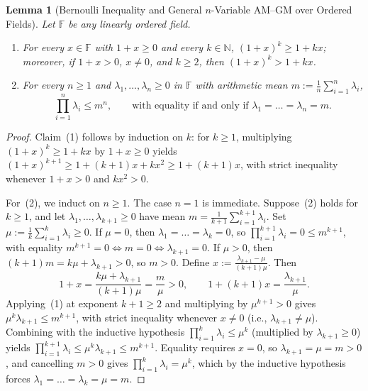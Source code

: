 \documentclass[11pt]{article}
\newtheorem{lemma}[theorem]{Lemma}
\theoremstyle{definition}
\theoremstyle{remark}
\begin{document}
\begin{lemma}[Bernoulli Inequality and General $n$-Variable AM--GM over Ordered Fields]
\label{lem:amgm}
Let $\mathbb{F}$ be any linearly ordered field.
\begin{enumerate}
  \item For every $x \in \mathbb{F}$ with $1 + x \ge 0$ and every $k \in \mathbb{N}$, $(1 + x)^k \ge 1 + k x$; moreover, if $1 + x > 0$, $x \neq 0$, and $k \ge 2$, then $(1 + x)^k > 1 + k x$.
  \item For every $n \ge 1$ and $\lambda_1, \dots, \lambda_n \ge 0$ in $\mathbb{F}$ with arithmetic mean $m := \frac{1}{n}\sum_{i=1}^n \lambda_i$,
  \[
    \prod_{i=1}^n \lambda_i \le m^n, \qquad\text{with equality if and only if }\lambda_1 = \dots = \lambda_n = m.
  \]
\end{enumerate}
\end{lemma}

\begin{proof}
Claim~(1) follows by induction on $k$: for $k \ge 1$, multiplying $(1+x)^k \ge 1 + kx$ by $1 + x \ge 0$ yields $(1+x)^{k+1} \ge 1 + (k+1)x + k x^2 \ge 1 + (k+1)x$, with strict inequality whenever $1 + x > 0$ and $k x^2 > 0$.

For~(2), we induct on $n \ge 1$. The case $n = 1$ is immediate. Suppose~(2) holds for $k \ge 1$, and let $\lambda_1, \dots, \lambda_{k+1} \ge 0$ have mean $m = \frac{1}{k+1}\sum_{i=1}^{k+1} \lambda_i$. Set $\mu := \frac{1}{k}\sum_{i=1}^k \lambda_i \ge 0$. If $\mu = 0$, then $\lambda_1 = \dots = \lambda_k = 0$, so $\prod_{i=1}^{k+1} \lambda_i = 0 \le m^{k+1}$, with equality $m^{k+1} = 0 \iff m = 0 \iff \lambda_{k+1} = 0$. If $\mu > 0$, then $(k+1)m = k\mu + \lambda_{k+1} > 0$, so $m > 0$. Define $x := \frac{\lambda_{k+1} - \mu}{(k+1)\mu}$. Then
\[
  1 + x = \frac{k\mu + \lambda_{k+1}}{(k+1)\mu} = \frac{m}{\mu} > 0, \qquad
  1 + (k + 1)x = \frac{\lambda_{k+1}}{\mu}.
\]
Applying~(1) at exponent $k + 1 \ge 2$ and multiplying by $\mu^{k+1} > 0$ gives $\mu^k \lambda_{k+1} \le m^{k+1}$, with strict inequality whenever $x \neq 0$ (i.e., $\lambda_{k+1} \neq \mu$). Combining with the inductive hypothesis $\prod_{i=1}^k \lambda_i \le \mu^k$ (multiplied by $\lambda_{k+1} \ge 0$) yields $\prod_{i=1}^{k+1} \lambda_i \le \mu^k \lambda_{k+1} \le m^{k+1}$. Equality requires $x = 0$, so $\lambda_{k+1} = \mu = m > 0$, and cancelling $m > 0$ gives $\prod_{i=1}^k \lambda_i = \mu^k$, which by the inductive hypothesis forces $\lambda_1 = \dots = \lambda_k = \mu = m$.
\end{proof}
\end{document}

